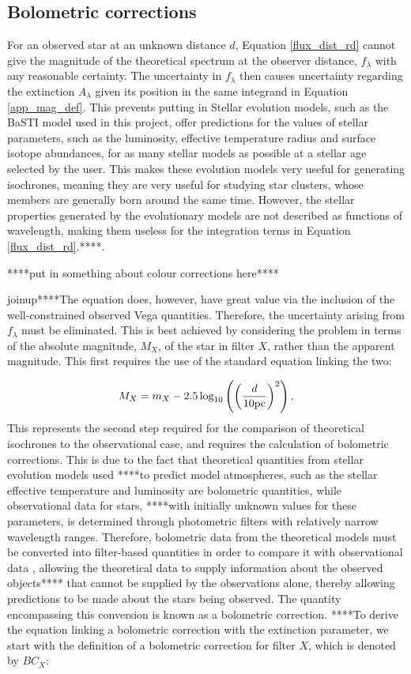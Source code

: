 \documentclass[12pt, a4paper]{report}
\begin{document}
\subsection{Bolometric corrections}

For an observed star at an unknown distance $d$, Equation \ref{flux_dist_rd} cannot give the magnitude of the theoretical spectrum at the observer distance, $f_{\lambda}$ with any reasonable certainty. The uncertainty in $f_{\lambda}$ then causes uncertainty regarding the extinction $A_{\lambda}$ given its position in the same integrand in Equation \ref{app_mag_def}. This prevents putting in Stellar evolution models, such as the BaSTI model used in this project, offer predictions for the values of stellar parameters, such as the luminosity, effective temperature radius and surface isotope abundances, for as many stellar models as possible at a stellar age selected by the user. This makes these evolution models very useful for generating isochrones, meaning they are very useful for studying star clusters, whose members are generally born around the same time. However, the stellar properties generated by the evolutionary models are not described as functions of wavelength, making them useless for the integration terms in Equation \ref{flux_dist_rd}.****. 

****put in something about colour corrections here****

joinup****The equation does, however, have great value via the inclusion of the well-constrained observed Vega quantities. Therefore, the uncertainty arising from $f_{\lambda}$ must be eliminated. This is best achieved by considering the problem in terms of the absolute magnitude, $M_{X}$, of the star in filter $X$, rather than the apparent magnitude. This first requires the use of the standard equation linking the two:

\begin{equation}
M_{X} = m_{X} - 2.5 \log_{10}\left( \left( \frac{d}{10 \textnormal{pc}} \right)^{2} \right),
\label{abs_mag_def}
\end{equation}
This represents the second step required for the comparison of theoretical isochrones to the observational case, and requires the calculation of bolometric corrections. This is due to the fact that theoretical quantities from stellar evolution models used ****to predict model atmospheres, such as the stellar effective temperature and luminosity are bolometric quantities, while observational data for stars, ****with initially unknown values for these parameters, is determined through photometric filters with relatively narrow wavelength ranges. Therefore, bolometric data from the theoretical models must be converted into filter-based quantities in order to compare it with observational data \citep{1996ApJ...469..355F}, allowing the theoretical data to supply information about the observed objects**** that cannot be supplied by the observations alone, thereby allowing predictions to be made about the stars being observed. The quantity encompassing this conversion is known as a bolometric correction. ****To derive the equation linking a bolometric correction with the extinction parameter, we start with the definition of a bolometric correction for filter $X$, which is denoted by $BC_{X}$:
\end{document}

